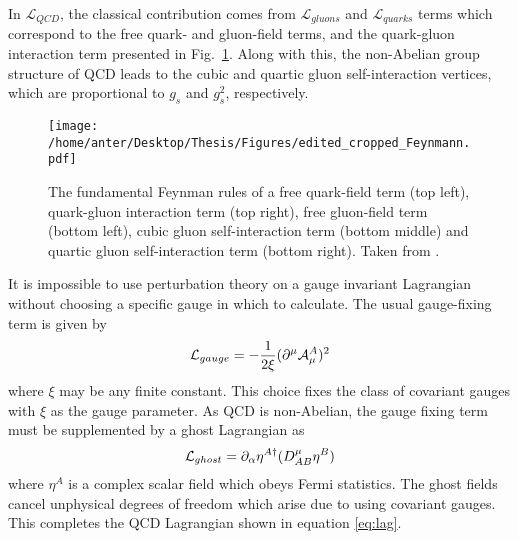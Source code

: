 In $\mathcal{L}_{QCD}$, the classical contribution comes from $\mathcal{L}_{gluons}$ and $\mathcal{L}_{quarks}$ terms which correspond to the free quark- and gluon-field terms, and the quark-gluon interaction term presented in Fig.~\ref{fig:feyn}. Along with this, the non-Abelian group structure of QCD leads to the cubic and quartic gluon self-interaction vertices, which are proportional to $g_s$ and $g^2_s$, respectively.

\begin{figure}[!h]
\begin{center}
\hspace*{-1mm}
\texttt{[image: /home/anter/Desktop/Thesis/Figures/edited\_cropped\_Feynmann.pdf]}\\
\vspace*{4mm}
\caption{The fundamental Feynman rules of a free quark-field term (top left), quark-gluon interaction term (top right), free gluon-field term (bottom left), cubic gluon self-interaction term (bottom middle) and quartic gluon self-interaction term (bottom right). Taken from \cite{Rabbertz:2017ssq}.}
\label{fig:feyn}
\end{center}
\end{figure}

It is impossible to use perturbation theory on a gauge invariant Lagrangian without choosing a specific gauge in which to calculate. The usual gauge-fixing term is given by 
\begin{equation}
{\cal L}_{gauge}=-\frac{1}{2\xi} (\partial^{\mu}{\cal A}^{A}_{\mu})^{2}
\label{eq:gauge-fixing}
\end{equation}
where $\xi$ may be any finite constant. This choice fixes the class of covariant gauges with $\xi$ as the gauge parameter. As QCD is non-Abelian, the gauge fixing term must be supplemented by a ghost Lagrangian as
\begin{equation}
{\cal L}_{ghost}=\partial_{\alpha}\eta^{A\dagger}(D^{\mu}_{AB}\eta^{B})
\label{eq:ghost}
\end{equation}
where $\eta^{A}$ is a complex scalar field which obeys Fermi statistics. The ghost fields cancel unphysical degrees of freedom which arise due to using covariant gauges. This completes the QCD Lagrangian shown in equation \ref{eq:lag}.

